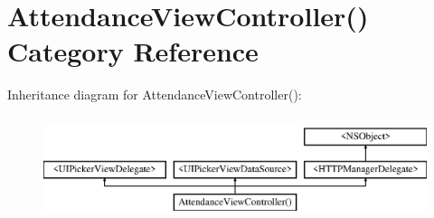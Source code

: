 \hypertarget{category_attendance_view_controller_07_08}{\section{Attendance\+View\+Controller() Category Reference}
\label{category_attendance_view_controller_07_08}
}
Inheritance diagram for Attendance\+View\+Controller()\+:\begin{figure}[H]
\begin{center}
\leavevmode
\includegraphics[height=3.000000cm]{category_attendance_view_controller_07_08}
\end{center}
\end{figure}
